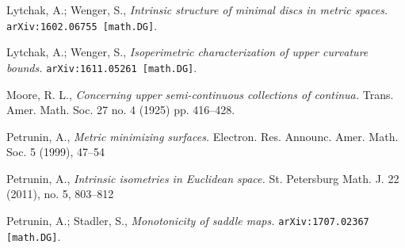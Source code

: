 \documentclass{article}
\begin{document}
\begin{thebibliography}{52}



Lytchak, A.; Wenger, S.,
\textit{Intrinsic structure of minimal discs in metric spaces.} 
\texttt{arXiv:1602.06755 [math.DG]}.


 Lytchak, A.; Wenger, S.,  
\textit{Isoperimetric  characterization  of  upper  curvature bounds.}
\texttt{arXiv:1611.05261 [math.DG]}.

Moore, R. L.,
\textit{Concerning upper semi-continuous collections of continua.}
Trans. Amer. Math. Soc. 27 no. 4 (1925) pp. 416--428.

 Petrunin, A.,
\textit{Metric minimizing surfaces.}
Electron. Res. Announc. Amer. Math. Soc. 5 (1999), 47--54 

 Petrunin, A.,
\textit{Intrinsic isometries in Euclidean space.}
St. Petersburg Math. J. 22 (2011), no. 5, 803--812 

 Petrunin, A.; Stadler, S.,
\textit{Monotonicity of saddle maps.} 
\texttt{arXiv:1707.02367 [math.DG]}.






\end{thebibliography}
\end{document}

